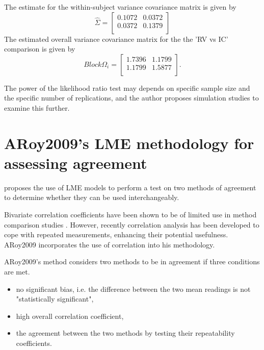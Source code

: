 \documentclass[12pt, a4paper]{report}
\theoremstyle{plain}
\theoremstyle{definition}
\theoremstyle{remark}
\begin{document}
	The estimate for the within-subject variance covariance matrix is
	given by
	\begin{equation}
	\hat{\Sigma}= \left[ \begin{array}{cc}
	0.1072 & 0.0372  \\
	0.0372 & 0.1379  \\
	\end{array}\right]
	\end{equation}
	The estimated overall variance covariance matrix for the the 'RV
	vs IC' comparison is given by
	\begin{equation}
	Block \Omega_{i}= \left[ \begin{array}{cc}
	1.7396 & 1.1799  \\
	1.1799 & 1.5877  \\
	\end{array} \right].
	\end{equation}
	
	The power of the
	likelihood ratio test may depends on specific sample size and the
	specific number of  replications, and the author proposes
	simulation studies to examine this further.
	
	\section{ARoy2009's LME methodology for assessing agreement}
	
	\citet{AARoy20092009} proposes the use of LME models to perform a test on two methods of agreement to determine whether they can be used
	interchangeably.
	
	Bivariate correlation coefficients have been shown to be of limited use in method comparison studies \citep{BA86}. However,
	recently correlation analysis has been developed to cope with
	repeated measurements, enhancing their potential usefulness. ARoy2009
	incorporates the use of correlation into his methodology.
	
	ARoy2009's method considers two methods to be in agreement if three
	conditions are met.
	
	\begin{itemize}
		\item no significant bias, i.e. the difference between the two
		mean readings is not "statistically significant",
		
		\item high overall correlation coefficient,
		
		\item the agreement between the two methods by testing their
		repeatability coefficients.
		
	\end{itemize}
	
\end{document}
